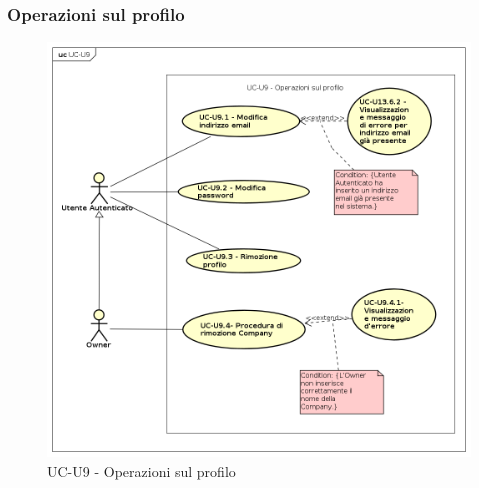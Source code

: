 \subsubsection{Operazioni sul profilo}

    \begin{figure}[H]
      \begin{center}
        \includegraphics[width=12cm]{res/img/UCUtenti/UCUtenteA/UC-U9- Operazioni sul profilo/UC-U9.png}
      \caption{UC-U9 - Operazioni sul profilo}
      \end{center} 
    \end{figure}    
    
